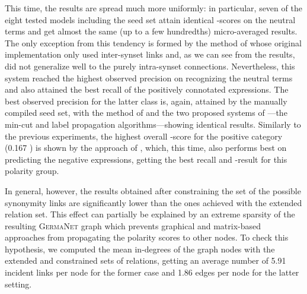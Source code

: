 This time, the results are spread much more uniformly: in particular,
seven of the eight tested models including the seed set attain
identical \F{}-scores on the neutral terms and get almost the same (up
to a few hundredths) micro-averaged results.  The only exception from
this tendency is formed by the method of \citet{Esuli:06c} whose
original implementation only used inter-synset links and, as we can
see from the results, did not generalize well to the purely
intra-synset connections.  Nevertheless, this system reached the
highest observed precision on recognizing the neutral terms and also
attained the best recall of the positively connotated expressions.
The best observed precision for the latter class is, again, attained
by the manually compiled seed set, with the method of
\citet{Kim:04,Kim:06} and the two proposed systems of
\citet{Rao:09}---the min-cut and label propagation
algorithms---showing identical results.  Similarly to the previous
experiments, the highest overall \F{}-score for the positive category
(0.167 \F{}) is shown by the approach of \citet{Blair-Goldensohn:08},
which, this time, also performs best on predicting the negative
expressions, getting the best recall and \F{}-result for this polarity
group.

In general, however, the results obtained after constraining the set
of the possible synonymity links are significantly lower than the ones
achieved with the extended relation set.  This effect can partially be
explained by an extreme sparsity of the resulting \textsc{GermaNet}
graph which prevents graphical and matrix-based approaches from
propagating the polarity scores to other nodes.  To check this
hypothesis, we computed the mean in-degrees of the graph nodes with
the extended and constrained sets of relations, getting an average
number of 5.91 incident links per node for the former case and 1.86
edges per node for the latter setting.

